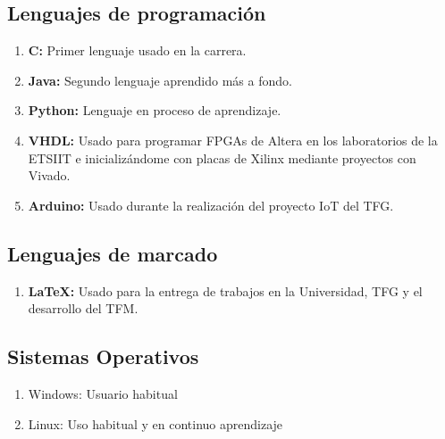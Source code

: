 \documentclass[letterpaper]{twentysecondcv-esp} %
\begin{document}
\subsection{Lenguajes de programación}
\begin{enumerate}
	\item \textbf{C:} Primer lenguaje usado en la carrera.
    \item \textbf{Java:} Segundo lenguaje aprendido más a fondo.
	\item \textbf{Python:} Lenguaje en proceso de aprendizaje.
	\item \textbf{VHDL:} Usado para programar FPGAs de Altera en los laboratorios de la ETSIIT e inicializándome con placas de Xilinx mediante proyectos con Vivado.
	\item \textbf{Arduino: } Usado durante la realización del proyecto IoT del TFG.
	
\end{enumerate}

\subsection{Lenguajes de marcado}
\begin{enumerate}
	\item \textbf{\LaTeX:} Usado para la entrega de trabajos en la Universidad, TFG y el desarrollo del TFM.
\end{enumerate}

\subsection{Sistemas Operativos}
\begin{enumerate}
	\item Windows: Usuario habitual
	\item Linux: Uso habitual y en continuo aprendizaje
\end{enumerate}
\end{document}
